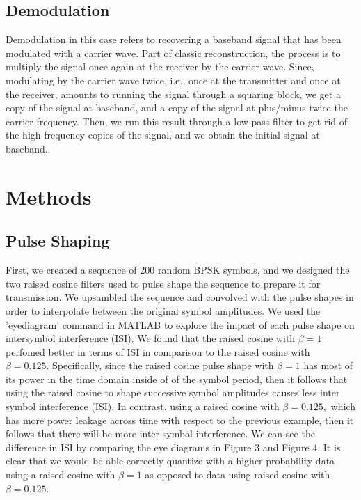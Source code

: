 \documentclass{article}
\begin{document}
\subsection{Demodulation}
Demodulation in this case refers to recovering a baseband signal that has been modulated with a carrier wave. Part of classic reconstruction, the process is to multiply the signal once again at the receiver by the carrier wave. Since, modulating by the carrier wave twice, i.e., once at the transmitter and once at the receiver, amounts to running the signal through a squaring block, we get a copy of the signal at baseband, and a copy of the signal at plus/minus twice the carrier frequency. Then, we run this result through a low-pass filter to get rid of the high frequency copies of the signal, and we obtain the initial signal at baseband.


\section{Methods}

\subsection{Pulse Shaping}
First, we created a sequence of 200 random BPSK symbols, and we designed the two raised cosine filters used to pulse shape the sequence to prepare it for transmission. We upsambled the sequence and convolved with the pulse shapes in order to interpolate between the original symbol amplitudes. We used the 'eyediagram' command in MATLAB to explore the impact of each pulse shape on intersymbol interference (ISI). We found that the raised cosine with $ \beta = 1 $ perfomed better in terms of ISI in comparison to the raised cosine with $ \beta = 0.125. $
\linebreak
Specifically, since the raised cosine pulse shape with $ \beta = 1 $ has most of its power in the time domain inside of of the symbol period, then it follows that using the raised cosine to shape successive symbol amplitudes causes less inter symbol interference (ISI). In contrast, using a raised cosine with $ \beta = 0.125, $ which has more power leakage across time with respect to the previous example, then it follows that there will be more inter symbol interference. We can see the difference in ISI by comparing the eye diagrams in Figure 3 and Figure 4. It is clear that we would be able correctly quantize with a higher probability data using a raised cosine with $ \beta = 1 $ as opposed to data using raised cosine with $ \beta = 0.125. $
\end{document}
